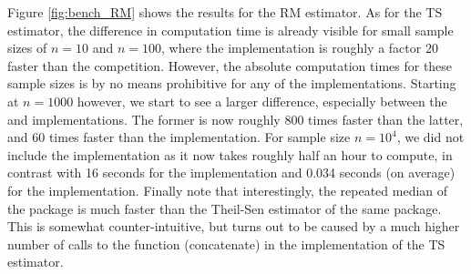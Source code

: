 Figure \ref{fig:bench_RM} shows the results for the RM estimator. As for the TS estimator, the difference in computation time is already visible for small sample sizes of $n=10$ and $n=100$, where the  implementation is roughly a factor 20 faster than the competition. However, the absolute computation times for these sample sizes is by no means prohibitive for any of the implementations. Starting at $n = 1000$ however, we start to see a larger difference, especially between the  and  implementations. The former is now roughly 800 times faster than the latter, and 60 times faster than the  implementation. For sample size $n = 10^4$, we did not include the  implementation as it now takes roughly half an hour to compute, in contrast with 16 seconds for the  implementation and 0.034 seconds (on average) for the  implementation. Finally note that interestingly, the repeated median of the  package is much faster than the Theil-Sen estimator of the same package. This is somewhat counter-intuitive, but turns out to be caused by a much higher number of calls to the  function (concatenate) in the implementation of the TS estimator.

